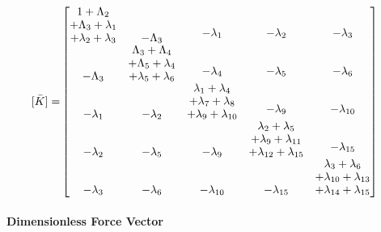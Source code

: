 \documentclass[12pt,a4paper]{article}
\begin{document}
\begin{equation}\label{Eq.stiffness_matrix_dimensionless}
\begin{aligned}
[\bar{K}] =& 
\begin{bmatrix}
\shortstack{$1 + \Lambda_2$ \\ $+ \Lambda_3 + \lambda_1$ \\ $+ \lambda_2 + \lambda_3$} & -\Lambda_3 & \shortstack{$-\lambda_1$ \\ \,} & \shortstack{$-\lambda_2$ \\ \,} & \shortstack{$-\lambda_3$ \\ \,} \\
-\Lambda_3 & \shortstack{$\Lambda_3 + \Lambda_4$ \\ $+ \Lambda_5 + \lambda_4$ \\ $+ \lambda_5 + \lambda_6$} & \shortstack{$-\lambda_4$ \\ \,} & \shortstack{$-\lambda_5$ \\ \,} & \shortstack{$-\lambda_6$ \\ \,} \\
-\lambda_1 & -\lambda_2 & \shortstack{$\lambda_1 + \lambda_4$ \\ $+ \lambda_7 + \lambda_8$ \\ $+ \lambda_9 + \lambda_{10}$} & \shortstack{$-\lambda_9$ \\ \,} & \shortstack{$-\lambda_{10}$ \\ \,} \\
-\lambda_2 & -\lambda_5 & -\lambda_9 & \shortstack{$\lambda_2 + \lambda_5$ \\ $+ \lambda_9 + \lambda_{11}$ \\ $+ \lambda_{12} + \lambda_{15}$} & \shortstack{$-\lambda_{15}$ \\ \,} \\
-\lambda_3 & -\lambda_{6} & -\lambda_{10} & -\lambda_{15} & \shortstack{$\lambda_3 + \lambda_6$ \\ $+ \lambda_{10} + \lambda_{13}$ \\ $+ \lambda_{14} + \lambda_{15}$}
\end{bmatrix}
\end{aligned}
\end{equation}

\paragraph{Dimensionless Force Vector}
\end{document}
